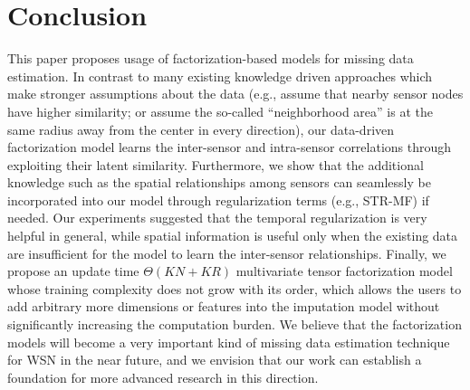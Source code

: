 \section{Conclusion}  \label{sec:conc}
This paper proposes usage of factorization-based models for missing data estimation.
In contrast to many existing knowledge driven approaches which make stronger assumptions about the data (e.g., assume that nearby sensor nodes have higher similarity; or assume the so-called ``neighborhood area'' is at the same radius away from the center in every direction), our data-driven factorization model learns the inter-sensor and intra-sensor correlations through exploiting their latent similarity.
Furthermore, we show that the additional knowledge such as the spatial relationships among sensors can seamlessly be incorporated into our model through regularization terms (e.g., STR-MF) if needed.
Our experiments suggested that the temporal regularization is very helpful in general, while spatial information is useful only when the existing data are insufficient for the model to learn the inter-sensor relationships.
Finally, we propose an update time $\Theta(KN + KR)$ multivariate tensor factorization model whose training complexity does not grow with its order, which allows the users to add arbitrary more dimensions or features into the imputation model without significantly increasing the computation burden.
We believe that the factorization models will become a very important kind of missing data estimation technique for WSN in the near future, and we envision that our work can establish a foundation for more advanced research in this direction.

